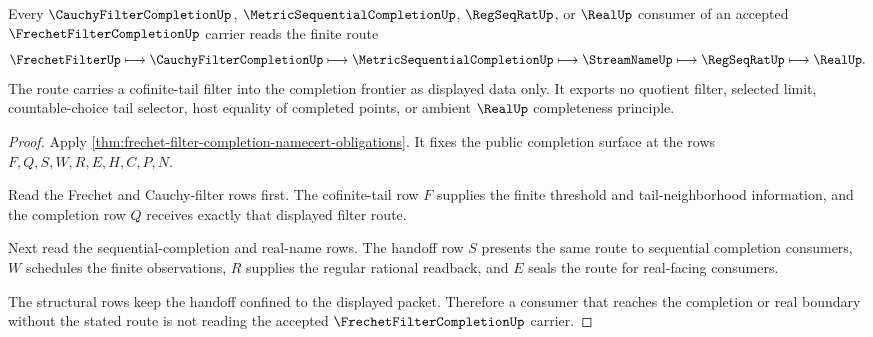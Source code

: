 \begin{theorem}
\label{thm:frechet-filter-completion-cauchy-handoff}
Every $\CauchyFilterCompletionUp$, $\MetricSequentialCompletionUp$, $\RegSeqRatUp$, or $\RealUp$ consumer of an accepted $\FrechetFilterCompletionUp$ carrier reads the finite route
$$
\FrechetFilterUp \longmapsto \CauchyFilterCompletionUp \longmapsto \MetricSequentialCompletionUp \longmapsto \StreamNameUp \longmapsto \RegSeqRatUp \longmapsto \RealUp .
$$
The route carries a cofinite-tail filter into the completion frontier as displayed data only. It exports no quotient filter, selected limit, countable-choice tail selector, host equality of completed points, or ambient $\RealUp$ completeness principle.
\end{theorem}
\begin{proof}
Apply \autoref{thm:frechet-filter-completion-namecert-obligations}. It fixes the public completion surface at the rows $F,Q,S,W,R,E,H,C,P,N$.

Read the Frechet and Cauchy-filter rows first. The cofinite-tail row $F$ supplies the finite threshold and tail-neighborhood information, and the completion row $Q$ receives exactly that displayed filter route.

Next read the sequential-completion and real-name rows. The handoff row $S$ presents the same route to sequential completion consumers, $W$ schedules the finite observations, $R$ supplies the regular rational readback, and $E$ seals the route for real-facing consumers.

The structural rows keep the handoff confined to the displayed packet. Therefore a consumer that reaches the completion or real boundary without the stated route is not reading the accepted $\FrechetFilterCompletionUp$ carrier.
\end{proof}



